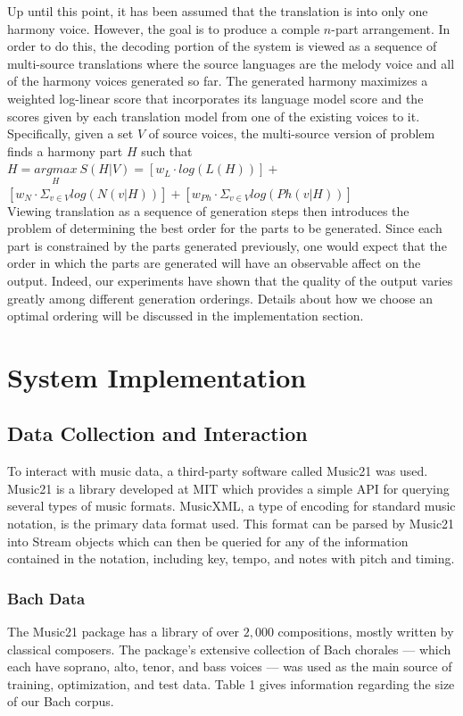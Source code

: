 \documentclass{sig-alternate}
\begin{document}
Up until this point, it has been assumed that the translation is into only one harmony voice. However, the goal is to produce a comple $n$-part arrangement. In order to do this, the decoding portion of the system is viewed as a sequence of multi-source translations where the source languages are the melody voice and all of the harmony voices generated so far. The generated harmony maximizes a weighted log-linear score that incorporates its language model score and the scores given by each translation model from one of the existing voices to it. Specifically, given a set $V$ of source voices, the multi-source version of problem finds a harmony part $H$ such that\\

$H = \underset{H}{argmax}\ S(H | V) = [w_{L}\cdot log(L(H))] + $\\

$[w_{N}\cdot \Sigma_{v \in V} log(N(v | H))] + [w_{Ph}\cdot \Sigma_{v \in V} log(Ph(v | H))]$\\

Viewing translation as a sequence of generation steps then introduces the problem of determining the best order for the parts to be generated. Since each part is constrained by the parts generated previously, one would expect that the order in which the parts are generated will have an observable affect on the output. Indeed, our experiments have shown that the quality of the output varies greatly among different generation orderings. Details about how we choose an optimal ordering will be discussed in the implementation section.

\section{System Implementation}
\label{sec:sys_implement}
\subsection{Data Collection and Interaction}
To interact with music data, a third-party software called Music21\cite{Cuthbert_music21:a} was used. Music21 is a library developed at MIT which provides a simple API for querying several types of music formats.  MusicXML, a type of encoding for standard music notation, is the primary data format used. This format can be parsed by Music21 into Stream objects which can then be queried for any of the information contained in the notation, including key, tempo, and notes with pitch and timing. 
\subsubsection{Bach Data}
The Music21 package has a library of over $2,000$ compositions, mostly written by classical composers. The package's extensive collection of Bach chorales --- which each have soprano, alto, tenor, and bass voices --- was used as the main source of training, optimization, and test data. Table 1 gives information regarding the size of our Bach corpus.
\end{document}
